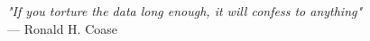 \begin{flushright}
\emph{"If you torture the data long enough, it will confess to anything"}\\
--- Ronald H. Coase
\end{flushright}